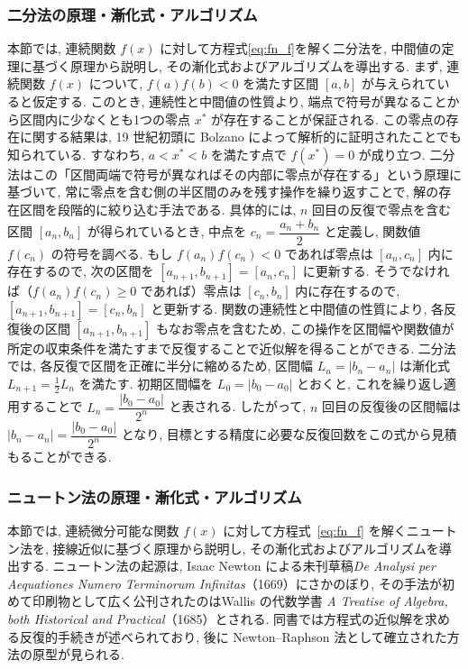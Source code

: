 \documentclass[a4paper,fontsize=11pt,line_length=40zw,number_of_lines=35,baselineskip=1.7zw]{jlreq}
\begin{document}
\subsubsection{二分法の原理・漸化式・アルゴリズム}
\label{sbsbsec:bisec}
本節では, 連続関数 $f(x)$ に対して方程式\ref{eq:fn_f}を解く二分法を, 中間値の定理に基づく原理から説明し, 
その漸化式およびアルゴリズムを導出する. 
まず, 連続関数 $f(x)$ について, $f(a)f(b)<0$ を満たす区間 $[a,b]$ が与えられていると仮定する. 
このとき, 連続性と中間値の性質より, 端点で符号が異なることから区間内に少なくとも1つの零点 $x^*$ が存在することが保証される. 
この零点の存在に関する結果は, 19 世紀初頭に Bolzano によって解析的に証明されたことでも知られている. \cite{bernardReinAnalytischerBeweis1817}
すなわち, $a<x^*<b$ を満たす点で $f(x^*)=0$ が成り立つ. 二分法はこの「区間両端で符号が異なればその内部に零点が存在する」という原理に基づいて, 
常に零点を含む側の半区間のみを残す操作を繰り返すことで, 解の存在区間を段階的に絞り込む手法である. 
具体的には, $n$ 回目の反復で零点を含む区間 $[a_n,b_n]$ が得られているとき, 
中点を $c_n=\dfrac{a_n+b_n}{2}$ と定義し, 関数値 $f(c_n)$ の符号を調べる. 
もし $f(a_n)f(c_n)<0$ であれば零点は $[a_n,c_n]$ 内に存在するので, 
次の区間を $[a_{n+1},b_{n+1}]=[a_n,c_n]$ に更新する. 
そうでなければ（$f(a_n)f(c_n)\ge 0$ であれば）零点は $[c_n,b_n]$ 内に存在するので, 
$[a_{n+1},b_{n+1}]=[c_n,b_n]$ と更新する. 
関数の連続性と中間値の性質により, 各反復後の区間 $[a_{n+1},b_{n+1}]$ もなお零点を含むため, 
この操作を区間幅や関数値が所定の収束条件を満たすまで反復することで近似解を得ることができる.\cite{三井田2014数値計算法} 
二分法では, 各反復で区間を正確に半分に縮めるため, 区間幅 $L_n=|b_n-a_n|$ は漸化式 $L_{n+1}=\tfrac{1}{2}L_n$ を満たす. 
初期区間幅を $L_0=|b_0-a_0|$ とおくと, これを繰り返し適用することで $L_n=\dfrac{|b_0-a_0|}{2^n}$ と表される. 
したがって, $n$ 回目の反復後の区間幅は $|b_n-a_n|=\dfrac{|b_0-a_0|}{2^n}$ となり, 目標とする精度に必要な反復回数をこの式から見積もることができる. 

\subsubsection{ニュートン法の原理・漸化式・アルゴリズム}
\label{sbsbsec:newton}
本節では, 連続微分可能な関数 $f(x)$ に対して方程式~\eqref{eq:fn_f} を解くニュートン法を, 接線近似に基づく原理から説明し, 
その漸化式およびアルゴリズムを導出する. 
ニュートン法の起源は, Isaac Newton による未刊草稿\emph{De Analysi per Aequationes Numero Terminorum Infinitas}（1669）にさかのぼり, \cite{newtonAnalysiAequationesNumero1669}
その手法が初めて印刷物として広く公刊されたのはWallis の代数学書 \emph{A Treatise of Algebra, both Historical and Practical}（1685）とされる. \cite{wallisTreatiseAlgebra1685}
同書では方程式の近似解を求める反復的手続きが述べられており, 後に Newton--Raphson 法として確立された方法の原型が見られる. 
\end{document}
